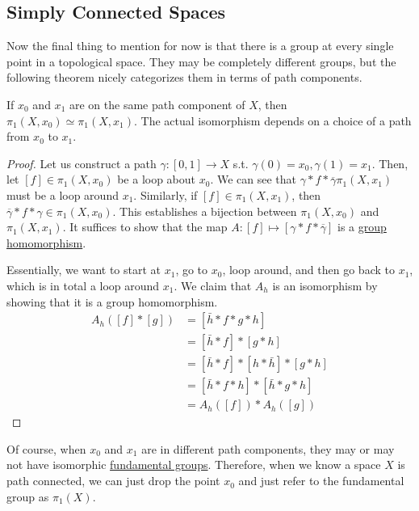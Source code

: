 \subsection{Simply Connected Spaces}

  Now the final thing to mention for now is that there is a group at every single point in a topological space. They may be completely different groups, but the following theorem nicely categorizes them in terms of path components. 

  \begin{theorem}
    \label{thm:fundamental-groups-of-points-in-a-path}
    If $x_0$ and $x_1$ are on the same path component of $X$, then $\pi_1 (X, x_0) \simeq \pi_1 (X, x_1)$. The actual isomorphism depends on a choice of a path from $x_0$ to $x_1$. 
  \end{theorem}
  \begin{proof}
		Let us construct a path $\gamma: [0, 1] \to X$ s.t. $\gamma(0) = x_0, \gamma(1) = x_1$. Then, let $[f] \in \pi_1 (X, x_0)$ be a loop about $x_0$. We can see that $\gamma \ast f \ast \overline{\gamma} \pi_1 (X, x_1)$ must be a loop around $x_1$. Similarly, if $[f] \in \pi_1 (X, x_1)$, then $\overline{\gamma} \ast f \ast \gamma \in \pi_1 (X, x_0)$. This establishes a bijection between $\pi_1 (X, x_0)$ and $\pi_1(X, x_1)$. It suffices to show that the map $A: [f] \mapsto [\gamma \ast f \ast \overline{\gamma}]$ is a \hyperref[alg-def:group-homomorphism]{group homomorphism}. 

    Essentially, we want to start at $x_1$, go to $x_0$, loop around, and then go back to $x_1$, which is in total a loop around $x_1$. We claim that $A_h$ is an isomorphism by showing that it is a group homomorphism. 
    \begin{align}
      A_h ([f] \ast [g]) & = [\bar{h} \ast f \ast g \ast h] \\ 
                         & = [\bar{h} \ast f] \ast [g \ast h] \\ 
                         & = [\bar{h} \ast f] \ast [h \ast \bar{h}] \ast [g \ast h] \\ 
                         & = [\bar{h} \ast f \ast h] \ast [\bar{h} \ast g \ast h] \\ 
                         & = A_h ([f]) \ast A_h ([g]) 
    \end{align}
  \end{proof}

  Of course, when $x_0$ and $x_1$ are in different path components, they may or may not have isomorphic \hyperref[def:fundamental-group]{fundamental groups}. Therefore, when we know a space $X$ is path connected, we can just drop the point $x_0$ and just refer to the fundamental group as $\pi_1 (X)$. 

